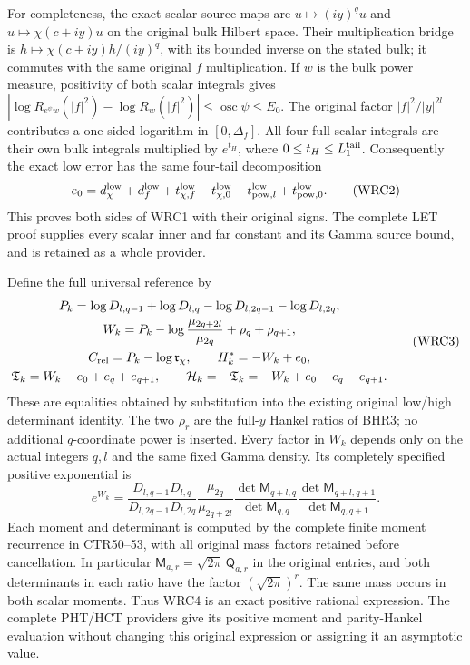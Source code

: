 \documentclass[11pt,a4paper]{article}
\begin{document}
For completeness, the exact scalar source maps are
$u\mapsto(iy)^q u$ and $u\mapsto\chi(c+iy)u$ on the
original bulk Hilbert space. Their multiplication bridge
is $h\mapsto\chi(c+iy)h/(iy)^q$, with its bounded inverse
on the stated bulk; it commutes with the same original
$f$ multiplication. If $w$ is the bulk power measure,
positivity of both scalar integrals gives
$|\log R_{e^\psi w}(|f|^2)-\log R_w(|f|^2)|
\leq\operatorname{osc}\psi\leq E_0$.
The original factor $|f|^2/|y|^{2l}$ contributes a
one-sided logarithm in $[0,\Delta_f]$.
All four full scalar integrals are their own bulk integrals
multiplied by $e^{t_H}$, where $0\leq t_H\leq L_1^{\rm tail}$.
Consequently the exact low error has the same four-tail
decomposition
\[
 e_0=d_\chi^{\rm low}+d_f^{\rm low}
  +t_{\chi,f}^{\rm low}-t_{\chi,0}^{\rm low}
  -t_{{\rm pow},l}^{\rm low}+t_{{\rm pow},0}^{\rm low}.
 \tag{WRC2}
\]
This proves both sides of WRC1 with their original signs.
The complete LET proof supplies every scalar inner and far
constant and its Gamma source bound, and is retained as a
whole provider.

Define the full universal reference by
\[
\begin{gathered}
 P_k=\log D_{l,q-1}+\log D_{l,q}
                     -\log D_{l,2q-1}-\log D_{l,2q},\\
 W_k=P_k-\log\frac{\mu_{2q+2l}}{\mu_{2q}}
                                  +\rho_q+\rho_{q+1},\\
 C_{\rm rel}=P_k-\log\mathfrak r_\chi,\qquad
 H_k^*=-W_k+e_0,\\
 \mathfrak T_k=W_k-e_0+e_q+e_{q+1},\qquad
 \mathcal H_k=-\mathfrak T_k=-W_k+e_0-e_q-e_{q+1}.
\end{gathered}\tag{WRC3}
\]
These are equalities obtained by substitution into the
existing original low/high determinant identity. The
two $\rho_r$ are the full-$y$ Hankel ratios of BHR3;
no additional $q$-coordinate power is inserted.
Every factor in $W_k$ depends only on the actual integers
$q,l$ and the same fixed Gamma density. Its completely
specified positive exponential is
\[
 e^{W_k}=
 \frac{D_{l,q-1}D_{l,q}}{D_{l,2q-1}D_{l,2q}}
 \frac{\mu_{2q}}{\mu_{2q+2l}}
 \frac{\det\mathsf M_{q+l,q}}{\det\mathsf M_{q,q}}
 \frac{\det\mathsf M_{q+l,q+1}}{\det\mathsf M_{q,q+1}}.
 \tag{WRC4}
\]
Each moment and determinant is computed by the complete
finite moment recurrence in CTR50--53, with all original
mass factors retained before cancellation. In particular
$\mathsf M_{a,r}=\sqrt{2\pi}\,\mathsf Q_{a,r}$ in the
original entries, and both determinants in each ratio
have the factor $(\sqrt{2\pi})^r$.
The same mass occurs in both scalar moments.
Thus WRC4 is an exact positive rational expression.
The complete PHT/HCT providers give its positive moment
and parity-Hankel evaluation without changing this original
expression or assigning it an asymptotic value.
\end{document}
